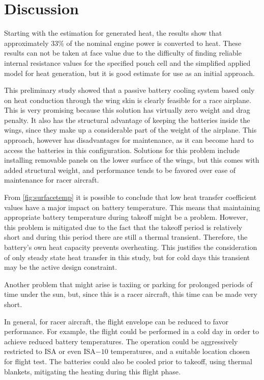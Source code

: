 \section{Discussion}
\label{sec:discussion}
Starting with the estimation for generated heat, the results show that approximately 33\% of the nominal engine power is converted to heat. These results can not be taken at face value due to the difficulty of finding reliable internal resistance values for the specified pouch cell and the simplified applied model for heat generation, but it is good estimate for use as an initial approach.

This preliminary study showed that a passive battery cooling system based only on heat conduction through the wing skin is clearly feasible for a race airplane. This is very promising because this solution has virtually zero weight and drag penalty. It also has the structural advantage of keeping the batteries inside the wings, since they make up a considerable part of the weight of the airplane. This approach, however has disadvantages for maintenance, as it can become hard to access the batteries in this configuration. Solutions for this problem include installing removable panels on the lower surface of the wings, but this comes with added structural weight, and performance tends to be favored over ease of maintenance for racer aircraft.

From \cref{fig:surfacetemp} it is possible to conclude that low heat transfer coefficient values have a major impact on battery temperature. This means that maintaining appropriate battery temperature during takeoff might be a problem. However, this problem is mitigated due to the fact that the takeoff period is relatively short and during this period there are still a thermal transient. Therefore, the battery's own heat capacity prevents overheating. This justifies the consideration of only steady state heat transfer in this study, but for cold days this transient may be the active design constraint.

Another problem that might arise is taxiing or parking for prolonged periods of time under the sun, but, since this is a racer aircraft, this time can be made very short.

In general, for  racer aircraft, the flight envelope can be reduced to favor performance. For example, the flight could be performed in a cold day in order to achieve reduced battery temperatures. The operation could be aggressively restricted to ISA or even ISA$-10$ temperatures, and a suitable location chosen for flight test. The batteries could also be cooled prior to takeoff, using thermal blankets, mitigating the heating during this flight phase.

